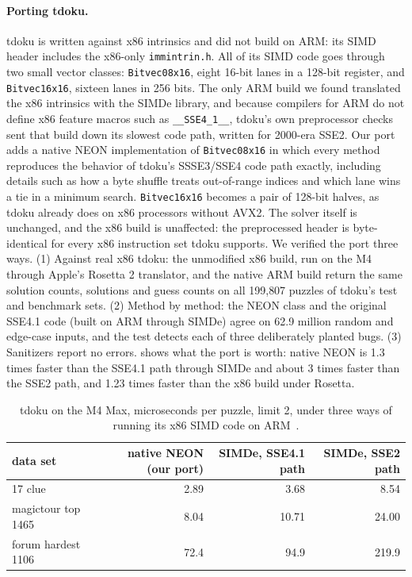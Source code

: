 \documentclass[11pt]{article}
\theoremstyle{definition}
\theoremstyle{plain}
\begin{document}
\paragraph{Porting tdoku.} tdoku is written against x86 intrinsics and did not build on ARM: its SIMD header includes
the x86-only \texttt{immintrin.h}. All of its SIMD code goes through two small vector classes: \texttt{Bitvec08x16},
eight 16-bit lanes in a 128-bit register, and \texttt{Bitvec16x16}, sixteen lanes in 256 bits. The only ARM build we
found translated the x86 intrinsics with the SIMDe library, and because compilers for ARM do not define x86 feature macros such as \texttt{\_\_SSE4\_1\_\_}, tdoku's
own preprocessor checks sent that build down its slowest code path, written for 2000-era SSE2. Our port~\cite{kelly2026tdokuarm}
adds a native NEON implementation of \texttt{Bitvec08x16} in which every method reproduces the behavior of tdoku's
SSSE3/SSE4 code path exactly, including details such as how a byte shuffle treats out-of-range indices and which lane
wins a tie in a minimum search. \texttt{Bitvec16x16} becomes a pair of 128-bit halves, as tdoku already does on x86
processors without AVX2. The solver itself is unchanged, and the x86 build is unaffected: the preprocessed header is
byte-identical for every x86 instruction set tdoku supports. We verified the port three ways. (1) Against real x86
tdoku: the unmodified x86 build, run on the M4 through Apple's Rosetta 2 translator, and the native ARM build return
the same solution counts, solutions and guess counts on all 199{,}807 puzzles of tdoku's test and benchmark sets. (2)
Method by method: the NEON class and the original SSE4.1 code (built on ARM through SIMDe) agree on 62.9 million
random and edge-case inputs, and the test detects each of three deliberately planted bugs. (3) Sanitizers report
no errors.  shows what the port is worth: native NEON is 1.3 times faster than the SSE4.1 path through
SIMDe and about 3 times faster than the SSE2 path, and 1.23 times faster than the x86 build under Rosetta.

\begin{table}[t]
\centering
\caption{tdoku on the M4 Max, microseconds per puzzle, limit 2, under three ways of running its x86 SIMD code on
ARM~\cite{kelly2026tdokuarm}.}
\label{tab:port}
\small
\begin{tabular}{lrrr}
\toprule
data set & native NEON (our port) & SIMDe, SSE4.1 path & SIMDe, SSE2 path \\
\midrule
17 clue & 2.89 & 3.68 & 8.54 \\
magictour top 1465 & 8.04 & 10.71 & 24.00 \\
forum hardest 1106 & 72.4 & 94.9 & 219.9 \\
\bottomrule
\end{tabular}
\end{table}
\end{document}
